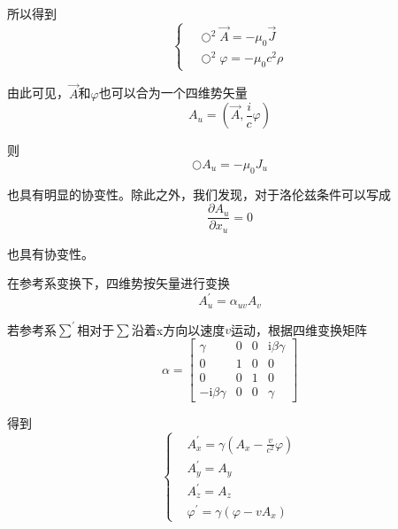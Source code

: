 \documentclass[UTF8]{ctexart}
\begin{document}
\noindent 所以得到
\begin{equation}
    \left \{ \begin{aligned}
        &\bigcirc^2 \vec{A}  = - \mu_0 \vec{J} \\ 
        & \bigcirc^2 \varphi = - \mu_0 c^2 \rho 
    \end{aligned} \right.
\end{equation}

\noindent 由此可见，$\vec{A}$和$\varphi$也可以合为一个四维势矢量
\begin{equation}
    A_u = (\vec{A},\frac{i}{c}\varphi)
\end{equation}

\noindent 则
\begin{equation}
    \bigcirc A_u = - \mu_0 J_u
\end{equation}

\noindent 也具有明显的协变性。除此之外，我们发现，对于洛伦兹条件可以写成
\begin{equation}
    \frac{\partial A_u}{\partial x_u} = 0
\end{equation}

\noindent 也具有协变性。 

    在参考系变换下，四维势按矢量进行变换
    \begin{equation}
        A_u^{\prime} = \alpha_{u v} A_v
    \end{equation}

\noindent 若参考系$\sum^{\prime}$相对于$\sum$沿着x方向以速度$v$运动，根据四维变换矩阵
\begin{equation}
\alpha=\left[\begin{array}{cccc}{\gamma} & {0} & {0} & {\mathrm{i} \beta \gamma} \\ {0} & {1} & {0} & {0} \\ {0} & {0} & {1} & {0} \\ {-\mathrm{i} \beta \gamma} & {0} & {0} & {\gamma}\end{array}\right]
\end{equation}

\noindent 得到
\begin{equation}
    \left \{ \begin{aligned}
        &A_x^{\prime} = \gamma\left(A_x-\frac{v}{c^2} \varphi\right) \\
        &A_y^{\prime} = A_y \\ 
        &A_z^{\prime} = A_z \\ 
        &\varphi^{\prime} = \gamma\left(\varphi - v A_x\right)
    \end{aligned} \right.
\end{equation}
\end{document}
